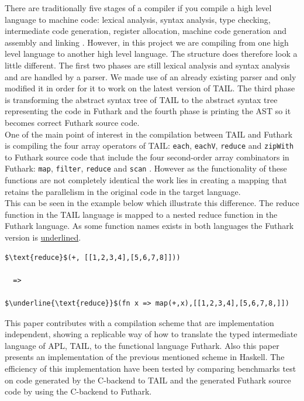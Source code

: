 \documentclass[11pt]{article}
\begin{document}
There are traditionally five stages of a compiler if you compile a high level language to machine code: 
lexical analysis, syntax analysis, type checking, intermediate code generation, register allocation, machine 
code generation and assembly and linking \cite{TorbenMogensen}. However, in this project we are compiling from 
one high level language to another high level language. The structure does therefore look a little different. 
The first two phases are still lexical analysis and syntax analysis and are handled by a parser.
We made use of an already existing parser \cite{APLACC} and only modified it in order for it to work on the latest 
version of TAIL. The third phase is transforming the abstract syntax tree of TAIL to the abstract syntax tree 
representing the code in Futhark and the fourth phase is printing the AST so it becomes correct 
Futhark source code. \\

One of the main point of interest in the compilation between TAIL and Futhark is compiling the four array operators 
of TAIL: {\tt each}, {\tt eachV}, 
 {\tt reduce} and {\tt zipWith} to Futhark source code that include the four second-order array combinators in Futhark:  
 {\tt map}, {\tt filter}, {\tt reduce} and {\tt scan} \cite{ElsmanDybdal:Array:2014}\cite{TroelsHenriksen}. 
However as the functionality of these functions are not completely 
identical the work lies in creating a mapping that retains the parallelism in the original code in the target language.\\
This can be seen in the example below which illustrate this difference. The reduce function in the
TAIL language is mapped to a nested reduce function in the Futhark language.
As some function names exists in both languages the Futhark version is \underline{underlined}.

\begin{lstlisting}[numbers=none,frame=none]
$\text{reduce}$(+, [[1,2,3,4],[5,6,7,8]]))

  =>

$\underline{\text{reduce}}$(fn x => map(+,x),[[1,2,3,4],[5,6,7,8,]])

\end{lstlisting}

This paper contributes with a compilation scheme that are implementation independent, showing a replicable 
way of how to translate the typed intermediate language of APL, TAIL, to the functional language Futhark. Also 
this paper presents an implementation of the previous mentioned scheme in Haskell. The efficiency of this
 implementation have been tested by comparing benchmarks test on code generated by the C-backend to TAIL 
 and the generated Futhark source code by using the C-backend to Futhark. \\
\end{document}
